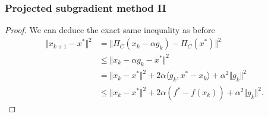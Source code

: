 \documentclass{beamer}
\begin{document}
\begin{frame}
  \frametitle{Projected subgradient method II}
  \begin{proof}
    We can deduce the exact same inequality as before
    \begin{equation}
      \begin{aligned}
        \Vert x_{k+1} - x^* \Vert^2 &= \Vert \Pi_C(x_k - \alpha g_k) - \Pi_C(x^*) \Vert^2 \\
        &\le \Vert x_k - \alpha g_k - x^* \Vert^2 \\
        &= \Vert x_k-x^* \Vert^2 + 2 \alpha \langle g_k, x^*-x_k \rangle + \alpha^2 \Vert g_k \Vert^2\\
        &\le \Vert x_k-x^* \Vert^2 + 2 \alpha (f^* - f(x_k))+ \alpha^2 \Vert g_k \Vert^2.
      \end{aligned}
    \end{equation}
  \end{proof}

\end{frame}
\end{document}

